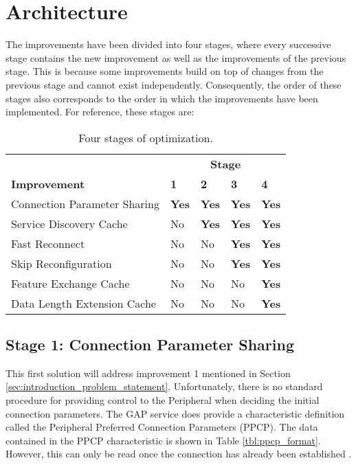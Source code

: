 \chapter{Architecture}
\label{chp:chapter_3}
The improvements have been divided into four stages, where every successive stage contains the new improvement as well as the improvements of the previous stage. This is because some improvements build on top of changes from the previous stage and cannot exist independently. Consequently, the order of these stages also corresponds to the order in which the improvements have been implemented. For reference, these stages are: 
\begin{table}[h]
    \begin{center}
    \begin{tabular}{|l|l|l|l|l|}
        \hline
                                     & \multicolumn{4}{c|}{\textbf{Stage}}   \\
        \textbf{Improvement}         & \textbf{1} & \textbf{2} & \textbf{3} & \textbf{4} \\
        \hline
        Connection Parameter Sharing & \textbf{Yes}        & \textbf{Yes}        & \textbf{Yes}        & \textbf{Yes} \\
        \hline
        Service Discovery Cache      & No         & \textbf{Yes}        & \textbf{Yes}        & \textbf{Yes} \\
        \hline
        Fast Reconnect               & No         & No         & \textbf{Yes}        & \textbf{Yes} \\
        \hline
        Skip Reconfiguration         & No         & No         & \textbf{Yes}        & \textbf{Yes} \\
        \hline
        Feature Exchange Cache       & No         & No         & No         & \textbf{Yes} \\
        \hline
        Data Length Extension Cache  & No         & No         & No         & \textbf{Yes} \\
        \hline
    \end{tabular}
    \end{center}
    \caption{Four stages of optimization.}
    \label{tbl:opt_stages}
\end{table}

\section{Stage 1: Connection Parameter Sharing}
\label{sec:ch_3_sharing_params}
This first solution will address improvement 1 mentioned in Section \ref{sec:introduction_problem_statement}. Unfortunately, there is no standard procedure for providing control to the Peripheral when deciding the initial connection parameters. The GAP service does provide a characteristic definition called the Peripheral Preferred Connection Parameters (PPCP). The data contained in the PPCP characteristic is shown in Table \ref{tbl:ppcp_format}. However, this can only be read once the connection has already been established \cite[p.~1361]{bluetooth_spec}. 

